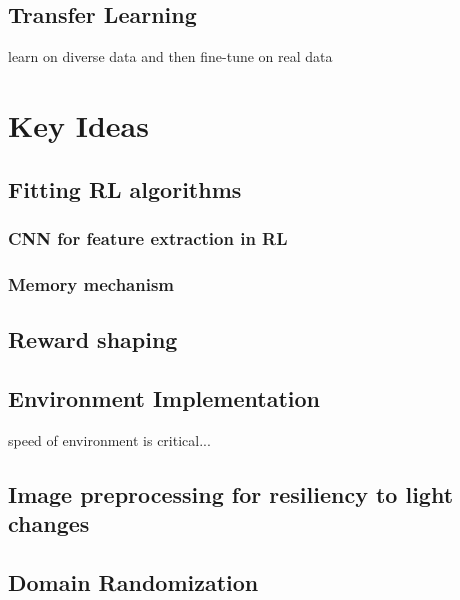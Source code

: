 \subsection{Transfer Learning}
learn on diverse data and then fine-tune on real data


\section{Key Ideas}

\subsection{Fitting RL algorithms}

\subsubsection{CNN for feature extraction in RL}

\subsubsection{Memory mechanism}


\subsection{Reward shaping}

\subsection{Environment Implementation}

speed of environment is critical...


\subsection{Image preprocessing for resiliency to light changes}

\subsection{Domain Randomization}




